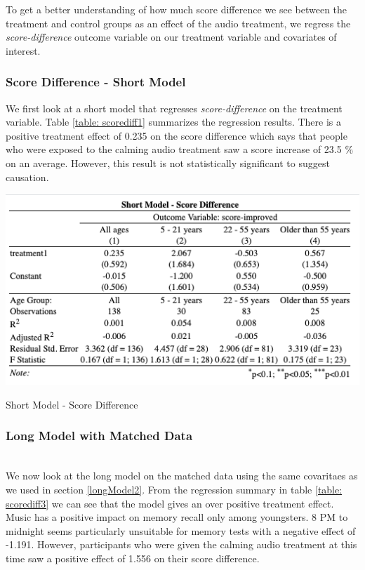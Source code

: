 \documentclass[journal,onecolumn, 12pt]{article}
\begin{document}
To get a better understanding of how much score difference we see between the treatment and control groups as an effect of the audio treatment, we regress the \textit{score-difference} outcome variable on our treatment variable and covariates of interest.

\subsubsection*{Score Difference - Short Model}
We first look at a short model that regresses \textit{score-difference} on the treatment variable. Table \ref{table: scorediff1} summarizes the regression results. There is a positive treatment effect of 0.235 on the score difference which says that people who were exposed to the calming audio treatment saw a score increase of 23.5 \% on an average. However, this result is not statistically significant to suggest causation.

\begin{table}[!h]
    \centering
    \includegraphics[scale = 0.7]{images/score_diff1.png}
    \caption{Short Model - Score Difference}
    \label{table: scorediff1}
\end{table}

\subsubsection*{Long Model with Matched Data}\\

We now look at the long model on the matched data using the same covaritaes as we used in section \ref{longModel2}. From the regression summary in table \ref{table: scorediff3} we can see that the model gives an over positive treatment effect. Music has a positive impact on memory recall only among youngsters. 8 PM to midnight seems particularly unsuitable for memory tests with a negative effect of -1.191. However, participants who were given the calming audio treatment at this time saw a positive effect of 1.556 on their score difference. \\
\end{document}
